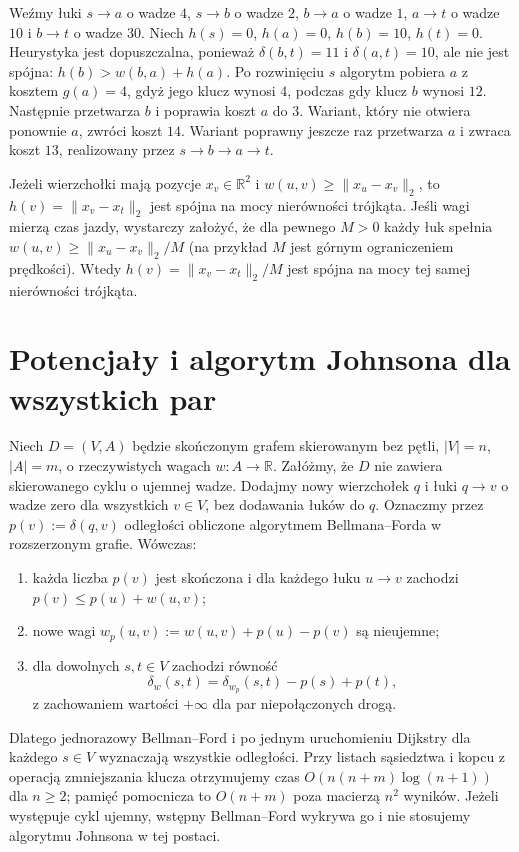 \begin{przyklad}
\label{ex:tg-astar-reopen}
Weźmy łuki $s\to a$ o wadze $4$,
$s\to b$ o wadze $2$, $b\to a$ o wadze $1$,
$a\to t$ o wadze $10$ i $b\to t$ o wadze $30$.
Niech $h(s)=0$, $h(a)=0$, $h(b)=10$, $h(t)=0$.
Heurystyka jest dopuszczalna, ponieważ
$\delta(b,t)=11$ i $\delta(a,t)=10$,
ale nie jest spójna: $h(b)>w(b,a)+h(a)$.
Po rozwinięciu $s$ algorytm pobiera $a$ z kosztem
$g(a)=4$, gdyż jego klucz wynosi $4$,
podczas gdy klucz $b$ wynosi $12$.
Następnie przetwarza $b$ i poprawia koszt
$a$ do $3$. Wariant, który nie otwiera
ponownie $a$, zwróci koszt $14$.
Wariant poprawny jeszcze raz przetwarza $a$
i zwraca koszt $13$, realizowany przez
$s\to b\to a\to t$.
\end{przyklad}

\begin{przyklad}
Jeżeli wierzchołki mają
pozycje $x_v\in\mathbb R^2$
i $w(u,v)\geq\|x_u-x_v\|_2$,
to $h(v)=\|x_v-x_t\|_2$
jest spójna na mocy
nierówności trójkąta.
Jeśli wagi mierzą czas jazdy, wystarczy założyć,
że dla pewnego $M>0$ każdy łuk spełnia
$w(u,v)\geq\|x_u-x_v\|_2/M$ (na przykład $M$
jest górnym ograniczeniem prędkości).
Wtedy $h(v)=\|x_v-x_t\|_2/M$ jest spójna
na mocy tej samej nierówności trójkąta.
\end{przyklad}

\section{Potencjały i algorytm Johnsona dla wszystkich par}
\label{sec:tg-weighted-johnson}

\begin{twierdzenie}
\label{thm:tg-weighted-johnson}
Niech $D=(V,A)$ będzie skończonym
grafem skierowanym bez pętli,
$|V|=n$, $|A|=m$, o rzeczywistych
wagach $w:A\to\mathbb R$.
Załóżmy, że $D$ nie zawiera
skierowanego cyklu o ujemnej wadze.
Dodajmy nowy wierzchołek $q$ i
łuki $q\to v$ o wadze zero
dla wszystkich $v\in V$,
bez dodawania łuków do $q$.
Oznaczmy przez
$p(v):=\delta(q,v)$ odległości
obliczone algorytmem Bellmana--Forda
w rozszerzonym grafie.
Wówczas:
\begin{enumerate}[label=(\roman*)]
\item każda liczba $p(v)$ jest skończona
i dla każdego łuku $u\to v$ zachodzi
$p(v)\le p(u)+w(u,v)$;
\item nowe wagi
$w_p(u,v):=w(u,v)+p(u)-p(v)$
są nieujemne;
\item dla dowolnych $s,t\in V$
zachodzi równość
\[
\delta_w(s,t)
=\delta_{w_p}(s,t)-p(s)+p(t),
\]
z zachowaniem wartości $+\infty$
dla par niepołączonych drogą.
\end{enumerate}
Dlatego jednorazowy Bellman--Ford
i po jednym uruchomieniu Dijkstry
dla każdego $s\in V$
wyznaczają wszystkie odległości.
Przy listach sąsiedztwa i kopcu
z operacją zmniejszania klucza
otrzymujemy czas
$O(n(n+m)\log(n+1))$ dla $n\ge2$;
pamięć pomocnicza to $O(n+m)$
poza macierzą $n^2$ wyników.
Jeżeli występuje cykl ujemny,
wstępny Bellman--Ford wykrywa
go i nie stosujemy algorytmu
Johnsona w tej postaci.
\end{twierdzenie}

